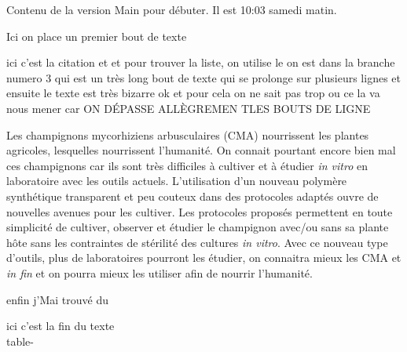 \documentclass{sn-jnl}%
\begin{document}
Contenu de la version Main pour débuter. Il est 10:03 samedi matin.



	Ici on place un premier bout de texte

 ici c'est la citation \cite{declerck_vitro_2005}et
\cite{fortin_arbuscular_2002}et pour trouver la liste,
\cite{silvani_novel_2019}on utilise le on est dans la branche numero 3 qui est
un très long bout de texte qui se prolonge sur plusieurs lignes et ensuite le
texte est très bizarre ok et pour cela on ne sait pas trop ou ce la va nous
mener car ON DÉPASSE ALLÈGREMEN TLES BOUTS DE LIGNE 



 Les champignons mycorhiziens arbusculaires (CMA) nourrissent les plantes
agricoles, lesquelles nourrissent l'humanité. On connait pourtant encore bien
mal ces champignons car ils sont très difficiles à cultiver et à étudier
\emph{in vitro} en laboratoire avec les outils actuels. L'utilisation d'un
nouveau polymère synthétique transparent et peu couteux dans des protocoles
adaptés ouvre de nouvelles avenues pour les cultiver. Les protocoles proposés
permettent en toute simplicité de cultiver, observer et étudier le champignon
avec/ou sans sa plante hôte sans les contraintes de stérilité des cultures
\textit{in vitro}. Avec ce nouveau type d'outils, plus de laboratoires pourront
les étudier, on connaitra mieux les CMA et \textit{in fin} et on pourra mieux
les utiliser afin de nourrir l'humanité.





enfin j'Mai trouvé du 


	ici c'est la fin du texte\\

	table-
\end{document}
